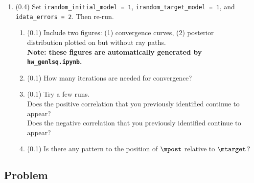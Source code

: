 \documentclass[11pt,titlepage,fleqn]{article}
\newcommand{\tfile}{{\tt hw\_genlsq.ipynb}}
\begin{document}
\begin{enumerate}

\item (0.4) Set \verb+irandom_initial_model = 1+, \verb+irandom_target_model = 1+, and \verb+idata_errors = 2+. Then re-run.
%
\begin{enumerate}
\item (0.1) Include two figures: (1) convergence curves, (2) posterior distribution plotted on  but without ray paths. \\
{\bf Note: these figures are automatically generated by \tfile.}
\item (0.1) How many iterations are needed for convergence?
\item (0.1) Try a few runs. \\
Does the positive correlation that you previously identified continue to appear? \\
Does the negative correlation that you previously identified continue to appear?
\item (0.1) Is there any pattern to the position of $\mpost$ relative to $\mtarget$?
\end{enumerate}

\end{enumerate}



\subsection*{Problem} \howmuchtime\




\clearpage\pagebreak


\end{document}
